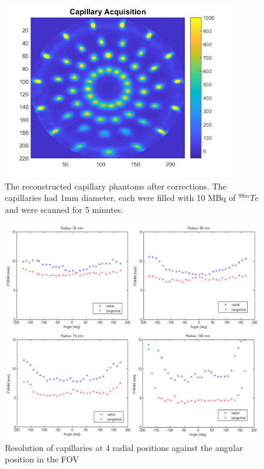\begin{figure}[!t]
\centering
\includegraphics[width=4in]{figures/Capillary_newLRF}

\caption{The reconstructed capillary phantoms after corrections. The capillaries had 1mm diameter, each were filled with 10 MBq of $^{99m}Tc$ and were scanned for 5 minutes.}
\label{fig:ImageRes}
\end{figure}

\begin{figure}[!t]
\centering
\includegraphics[width=5in]{figures/resolutions.png}

\caption{Resolution of capillaries at 4 radial positions against the angular position in the \acrshort{FOV}}
\label{fig:resolution}
\end{figure}

